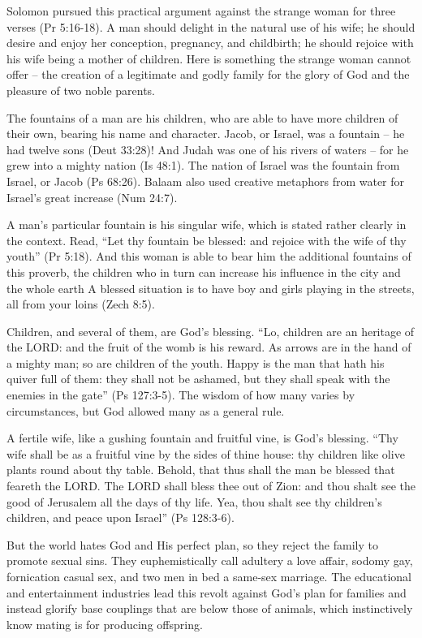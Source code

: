 Solomon pursued this practical argument against the strange woman for three verses (Pr 5:16-18). A man should delight in the natural use of his wife; he should desire and enjoy her conception, pregnancy, and childbirth; he should rejoice with his wife being a mother of children. Here is something the strange woman cannot offer – the creation of a legitimate and godly family for the glory of God and the pleasure of two noble parents. 

The fountains of a man are his children, who are able to have more children of their own, bearing his name and character. Jacob, or Israel, was a fountain – he had twelve sons (Deut 33:28)! And Judah was one of his rivers of waters – for he grew into a mighty nation (Is 48:1). The nation of Israel was the fountain from Israel, or Jacob (Ps 68:26). Balaam also used creative metaphors from water for Israel’s great increase (Num 24:7).

A man’s particular fountain is his singular wife, which is stated rather clearly in the context. Read, “Let thy fountain be blessed: and rejoice with the wife of thy youth” (Pr 5:18). And this woman is able to bear him the additional fountains of this proverb, the children who in turn can increase his influence in the city and the whole earth A blessed situation is to have boy and girls playing in the streets, all from your loins (Zech 8:5).

Children, and several of them, are God’s blessing. “Lo, children are an heritage of the LORD: and the fruit of the womb is his reward. As arrows are in the hand of a mighty man; so are children of the youth. Happy is the man that hath his quiver full of them: they shall not be ashamed, but they shall speak with the enemies in the gate” (Ps 127:3-5). The wisdom of how many varies by circumstances, but God allowed many as a general rule.

A fertile wife, like a gushing fountain and fruitful vine, is God’s blessing. “Thy wife shall be as a fruitful vine by the sides of thine house: thy children like olive plants round about thy table. Behold, that thus shall the man be blessed that feareth the LORD. The LORD shall bless thee out of Zion: and thou shalt see the good of Jerusalem all the days of thy life. Yea, thou shalt see thy children’s children, and peace upon Israel” (Ps 128:3-6).

But the world hates God and His perfect plan, so they reject the family to promote sexual sins. They euphemistically call adultery a love affair, sodomy gay, fornication casual sex, and two men in bed a same-sex marriage. The educational and entertainment industries lead this revolt against God’s plan for families and instead glorify base couplings that are below those of animals, which instinctively know mating is for producing offspring.

